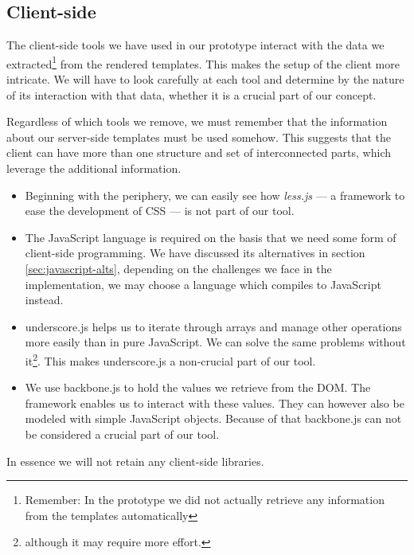 \documentclass[thesis.tex]{subfiles}
\begin{document}
\subsection{Client-side}
The client-side tools we have used in our prototype interact with the data we
extracted\footnote{Remember: In the prototype we did not actually retrieve any
information from the templates automatically} from the rendered templates.
This makes the setup of the client more intricate.
We will have to look carefully at each tool and determine by the nature of its
interaction with that data, whether it is a crucial part of our concept.

Regardless of which tools we remove, we must remember that the information about
our server-side templates must be used somehow. This suggests that the
client can have more than one structure and set of interconnected parts, which
leverage the additional information.

\begin{itemize}
\item Beginning with the periphery, we can easily see how \emph{less.js}
	--- a framework to ease the development of CSS --- is not part of our tool.
\item The JavaScript language is required on the basis that we need some form of
	client-side programming. We have discussed its alternatives in
	section \ref{sec:javascript-alts}, depending on the challenges we face in the
	implementation, we may choose a language which compiles to JavaScript instead.
\item underscore.js helps us to iterate through arrays and manage other
	operations more easily than in pure JavaScript. We can solve the same problems
	without it\footnote{although it may require more effort.}.
	This makes underscore.js a non-crucial part of our tool.
\item We use backbone.js to hold the values we retrieve from the DOM. The
	framework enables us to interact with these values. They can however also be
	modeled with simple JavaScript objects. Because of that backbone.js can not be
	considered a crucial part of our tool.
\end{itemize}

In essence we will not retain any client-side libraries.
\end{document}
